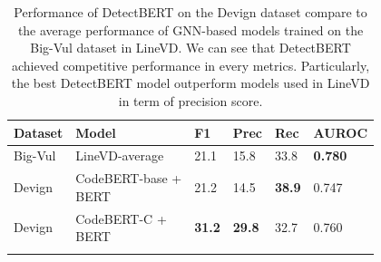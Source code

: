\documentclass{ieeeaccess}
\begin{document}
\begin{table}[h]
\centering
\begin{tabular}{llllll}
\Xhline{2\arrayrulewidth}
\textbf{Dataset}&\textbf{Model} & \textbf{F1} & \textbf{Prec}&  \textbf{Rec}&  \textbf{AUROC}\\
\hline
\rowcolor{gray!15} 
Big-Vul&LineVD-average &21.1 & 15.8  & 33.8 & \textbf{0.780}\\
Devign&\makecell[align=left]{CodeBERT-base\cite{codebert} + \\ BERT} & 21.2 & 14.5 & \textbf{38.9} & 0.747\\
\rowcolor{gray!15} 
Devign&\makecell[align=left]{CodeBERT-C\cite{zhou2023codebertscore} +\\ BERT} &  \textbf{31.2} & \textbf{29.8} & 32.7 & 0.760\\
\Xhline{2\arrayrulewidth}
\end{tabular}

\caption{Performance of DetectBERT on the Devign dataset compare to the average performance of GNN-based models trained on the Big-Vul dataset in LineVD\cite{Linevd}.  We can see  that DetectBERT achieved competitive performance in every metrics.  Particularly, the best DetectBERT model outperform models used in LineVD in term of precision score. }
\label{table:RQ5_exp_res}
\end{table}
\end{document}
